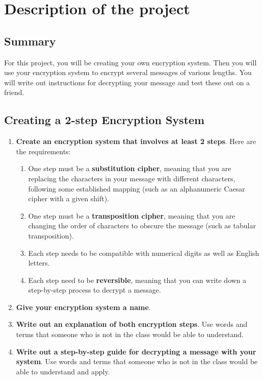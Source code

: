 \section{Description of the project}

\subsection*{ Summary} For this project, you will be creating your own
encryption system. Then you will use
your encryption system to encrypt several messages of various
lengths. You will write out
instructions for decrypting your message and test these out on a
friend.


\subsection{Creating a 2-step Encryption System}
\begin{enumerate}
\item {\bf Create an encryption system that involves at least 2 steps}.
  Here are the requirements:
  \begin{enumerate}
  \item One step must be a {\bf substitution cipher}, meaning that you
    are replacing the
    characters in your message with different characters, following
    some established
    mapping (such as an alphanumeric Caesar cipher with a given
    shift).
  \item One step must be a {\bf transposition cipher}, meaning that
    you are changing the
    order of characters to obscure the message (such as tabular
    transposition).
  \item Each step needs to be compatible with numerical digits as
    well as English letters.
  \item Each step need to be {\bf reversible}, meaning that you can
    write down a step-by-step process to decrypt a message.
  \end{enumerate}
  
\item {\bf Give your encryption system a name}.
\item {\bf Write out an explanation of both encryption steps}.
  Use words and terms that someone
  who is not in the class would be able to understand.
\item {\bf Write out a step-by-step guide for decrypting a message
    with your system}. Use words
  and terms that someone who is not in the class would be able to
  understand and apply.
\end{enumerate}


